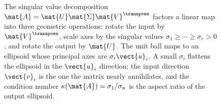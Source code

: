 \begin{figure}[ht]
\caption[The SVD as rotate, scale, rotate]{The singular value
decomposition $\mat{A} = \mat{U}\mat{\Sigma}\mat{V}^{\transpose}$
factors a linear map into three geometric operations: rotate the
input by $\mat{V}^{\transpose}$, scale axes by the singular values
$\sigma_{1} \geq \cdots \geq \sigma_{r} > 0$, and rotate the output
by $\mat{U}$. The unit ball maps to an ellipsoid whose principal
axes are $\sigma_{i}\vect{u}_{i}$. A small $\sigma_{i}$ flattens the
ellipsoid in the $\vect{u}_{i}$ direction; the input direction
$\vect{v}_{i}$ is the one the matrix nearly annihilates, and the
condition number $\kappa(\mat{A}) = \sigma_{1}/\sigma_{n}$ is the
aspect ratio of the output ellipsoid.}
\label{fig:vol02:ch09:svd-geometry}
\end{figure}
